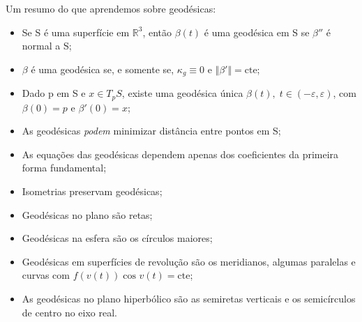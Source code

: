 \documentclass[../differential_geometry.tex]{subfiles}
\begin{document}
Um resumo do que aprendemos sobre geodésicas:
\begin{itemize}
	\item Se S é uma superfície em \(\mathbb{R}^{3}\), então \(\beta (t)\) é uma geodésica em S se \(\beta ''\) é normal a S;
	\item \(\beta \) é uma geodésica se, e somente se, \(\kappa_{g}\equiv 0\) e \(\Vert \beta ' \Vert=\mathrm{cte}\);
	\item Dado p em S e \(x\in T_{p}S\), existe uma geodésica única \(\beta (t),\; t\in (-\varepsilon , \varepsilon )\), com \(\beta (0) = p \) e \(\beta '(0) = x\);
	\item As geodésicas \textit{podem} minimizar distância entre pontos em S;
	\item As equações das geodésicas dependem apenas dos coeficientes da primeira forma fundamental;
	\item Isometrias preservam geodésicas;
	\item Geodésicas no plano são retas;
	\item Geodésicas na esfera são os círculos maiores;
	\item Geodésicas em superfícies de revolução são os meridianos, algumas paralelas e curvas com \(f(v(t))\cos^{}{v(t)}=\mathrm{cte}\);
	\item As geodésicas no plano hiperbólico são as semiretas verticais e os semicírculos de centro no eixo real.
\end{itemize}
\end{document}
